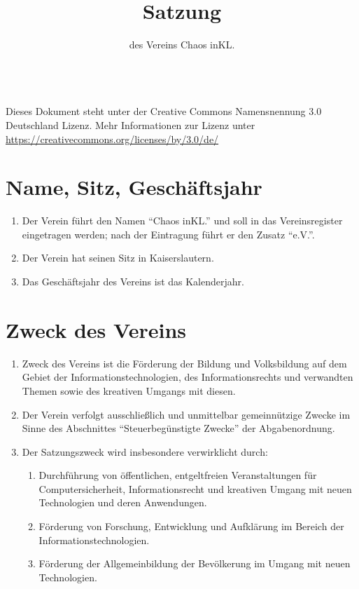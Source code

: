 \documentclass[a4paper, 12pt]{scrartcl}
\begin{document}
\title{Satzung}
\subtitle{des Vereins Chaos inKL.}
\author{}
\date{}

\maketitle

\tableofcontents

\vfill

\begin{flushright}
	\ccby \\
	{\small
		Dieses Dokument steht unter der Creative Commons Namensnennung 3.0 Deutschland Lizenz. Mehr Informationen zur Lizenz unter \url{https://creativecommons.org/licenses/by/3.0/de/}
	}
\end{flushright}

\newpage
\section{Name, Sitz, Geschäftsjahr}
\begin{enumerate}
	\item Der Verein führt den Namen "`Chaos inKL."' und soll in das Vereinsregister eingetragen werden; nach der Eintragung führt er den Zusatz "`e.V."'.
	\item Der Verein hat seinen Sitz in Kaiserslautern.
	\item Das Geschäftsjahr des Vereins ist das Kalenderjahr.
\end{enumerate}

\section{Zweck des Vereins}
\begin{enumerate}
	\item Zweck des Vereins ist die Förderung der Bildung und Volksbildung auf dem Gebiet der Informationstechnologien, des Informationsrechts und verwandten Themen sowie des kreativen Umgangs mit diesen.
	\item Der Verein verfolgt ausschließlich und unmittelbar gemeinnützige Zwecke im Sinne des Abschnittes "`Steuerbegünstigte Zwecke"' der Abgabenordnung.
	\item Der Satzungszweck wird insbesondere verwirklicht durch:
	\begin{enumerate}
		\item Durchführung von öffentlichen, entgeltfreien Veranstaltungen für Computersicherheit, Informationsrecht und kreativen Umgang mit neuen Technologien und deren Anwendungen.
		\item Förderung von Forschung, Entwicklung und Aufklärung im Bereich der Informationstechnologien.
		\item Förderung der Allgemeinbildung der Bevölkerung im Umgang mit neuen Technologien.
	\end{enumerate}
\end{enumerate}
\end{document}
